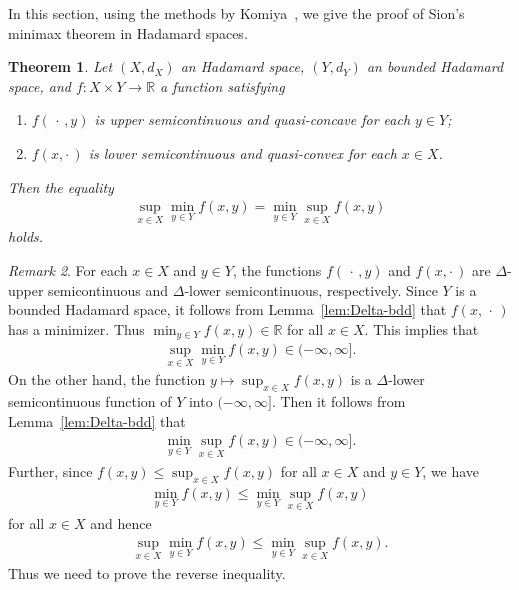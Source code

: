 \documentclass[draft]{amsart}
\numberwithin{equation}{section}
\def\R{\mathbb R}
\theoremstyle{plain}
\newtheorem{theorem}{Theorem}[section]
\theoremstyle{definition}
\theoremstyle{remark}
\newtheorem{remark}[theorem]{Remark}
\begin{document}
In this section, using the methods by Komiya~\cite{MR0930413}, we give the proof of 
Sion's minimax theorem in Hadamard spaces. 

\begin{theorem}\label{thm:Sion-CAT0}
 Let $(X,d_X)$ an Hadamard space, $(Y,d_Y)$ an bounded Hadamard space, and 
 $f\colon X\times Y\to \R$ a function satisfying 
 \begin{enumerate}
  \item[(i)] $f(\,\cdot\,,y)$ is upper semicontinuous 
 and quasi-concave for each $y\in Y$; 
  \item[(ii)] $f(x,\cdot \,)$ is lower semicontinuous 
 and quasi-convex for each $x\in X$. 
 \end{enumerate}
 Then the equality 
 \begin{align}
  \sup_{x\in X}\min_{y\in Y} f(x,y)=\min_{y\in Y} \sup_{x\in X} f(x,y) 
 \end{align}
 holds. 
\end{theorem}

\begin{remark}\label{rem:Sion-CAT0}
 For each $x\in X$ and $y\in Y$, the functions 
 $f(\,\cdot\,, y)$ and $f(x, \cdot\,)$ are $\Delta$-upper semicontinuous 
 and $\Delta$-lower semicontinuous, respectively. 
 Since $Y$ is a bounded Hadamard space, 
 it follows from Lemma~\ref{lem:Delta-bdd} that 
 $f(x,\,\cdot\,)$ has a minimizer. Thus $\min_{y\in Y}f(x,y)\in \R$ 
 for all $x\in X$. This implies that 
 \begin{align}
  \sup_{x\in X}\min_{y\in Y}f(x,y)\in (-\infty, \infty]. 
 \end{align}
 On the other hand, the function 
 $y\mapsto \sup_{x\in X}f(x,y)$ 
 is a $\Delta$-lower semicontinuous function of $Y$ into $(-\infty, \infty]$. 
 Then it follows from Lemma~\ref{lem:Delta-bdd} that 
 \begin{align}
  \min_{y\in Y}\sup_{x\in X} f(x,y)\in (-\infty, \infty]. 
 \end{align}
 Further, since $f(x,y)\leq \sup_{x\in X}f(x,y)$ 
 for all $x\in X$ and $y\in Y$, we have 
 \begin{align}
  \min_{y\in Y}f(x,y)\leq \min_{y\in Y}\sup_{x\in X}f(x,y)
 \end{align}
 for all $x\in X$ and hence 
 \begin{align}
  \sup_{x\in X}\min_{y\in Y}f(x,y)\leq \min_{y\in Y}\sup_{x\in X}f(x,y). 
 \end{align}
 Thus we need to prove the reverse inequality. 
\end{remark}
\end{document}
